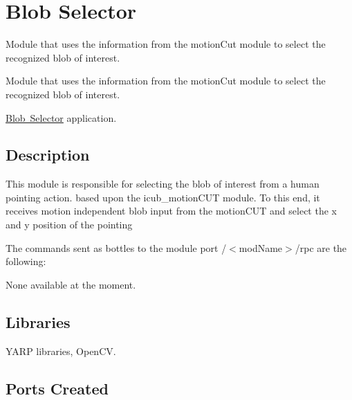 \section{Blob Selector}
\label{group__icub__blobSelector}


Module that uses the information from the motion\+Cut module to select the recognized blob of interest.  


Module that uses the information from the motion\+Cut module to select the recognized blob of interest. 

\mbox{\hyperlink{group__icub__blobSelector}{Blob Selector}} application.\hypertarget{group__iolReachingCalibration_intro_sec}{}\subsection{Description}\label{group__iolReachingCalibration_intro_sec}
This module is responsible for selecting the blob of interest from a human pointing action. based upon the icub\+\_\+motion\+C\+UT module. To this end, it receives motion independent blob input from the motion\+C\+UT and select the x and y position of the pointing

The commands sent as bottles to the module port /$<$mod\+Name$>$/rpc are the following\+:

None available at the moment.\hypertarget{group__icub__iolStateMachineHandler_lib_sec}{}\subsection{Libraries}\label{group__icub__iolStateMachineHandler_lib_sec}

\begin{DoxyItemize}
\item Y\+A\+RP libraries, Open\+CV.
\end{DoxyItemize}\hypertarget{group__icub__iolStateMachineHandler_portsc_sec}{}\subsection{Ports Created}\label{group__icub__iolStateMachineHandler_portsc_sec}

